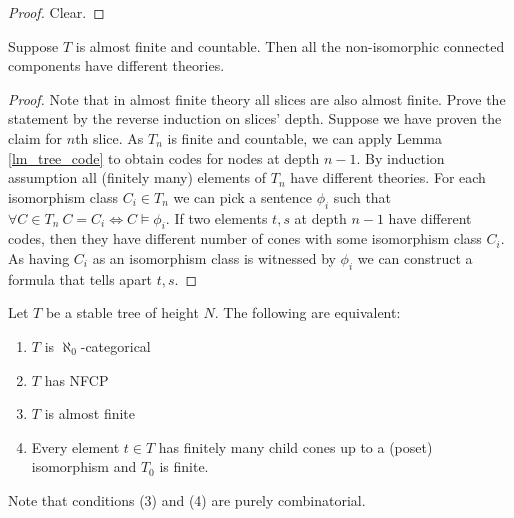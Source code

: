\documentclass{amsart}
\begin{document}
\begin{proof}
	Clear.
\end{proof}

\begin{Lemma} \label{lm_categoricity}
	Suppose $T$ is almost finite and countable. Then all the non-isomorphic connected components have different theories.
\end{Lemma}

\begin{proof}
	Note that in almost finite theory all slices are also almost finite. Prove the statement by the reverse induction on slices' depth. Suppose we have proven the claim for $n$th slice. As $T_n$ is finite and countable, we can apply Lemma \ref{lm_tree_code} to obtain codes for nodes at depth $n-1$. By induction assumption all (finitely many) elements of $T_n$ have different theories. For each isomorphism class $C_i \in T_n$ we can pick a sentence $\phi_i$ such that $\forall C \in T_n \  C = C_i \iff C \models \phi_i$. If two elements $t,s$ at depth $n-1$ have different codes, then they have different number of cones with some isomorphism class $C_i$. As having $C_i$ as an isomorphism class is witnessed by $\phi_i$ we can construct a formula that tells apart $t,s$.
\end{proof}

\begin{Theorem}
	Let $T$ be a stable tree of height $N$. The following are equivalent:
	\begin{enumerate}
		\item $T$ is $\aleph_0$-categorical
		\item $T$ has NFCP
		\item $T$ is almost finite
		\item Every element $t \in T$ has finitely many child cones up to a (poset) isomorphism and $T_0$ is finite.
	\end{enumerate}
\end{Theorem}

Note that conditions (3) and (4) are purely combinatorial.
\end{document}
